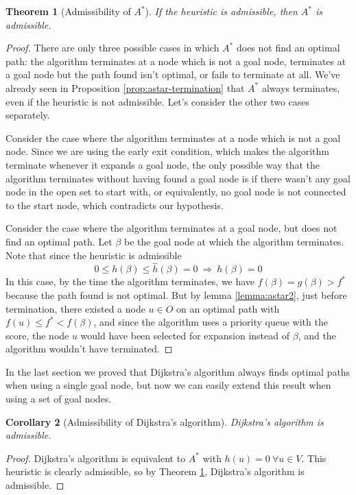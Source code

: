 \documentclass[a4paper,10pt]{report}
\newtheorem{theorem}{Theorem}[chapter]
\newtheorem{corollary}[theorem]{Corollary}
\begin{document}
\begin{theorem}[Admissibility of $A^*$]
\label{thm:astar}
If the heuristic is admissible, then $A^*$ is admissible.
\end{theorem}
\begin{proof}
There are only three possible cases in which $A^*$ does not find an optimal path: the algorithm terminates at a node which is not a goal node, terminates at a goal node but the path found isn't optimal, or fails to terminate at all. We've already seen in Proposition \ref{prop:astar-termination} that $A^*$ always terminates, even if the heuristic is not admissible. Let's consider the other two cases separately.

Consider the case where the algorithm terminates at a node which is not a goal node. Since we are using the early exit condition, which makes the algorithm terminate whenever it expands a goal node, the only possible way that the algorithm terminates without having found a goal node is if there wasn't any goal node in the open set to start with, or equivalently, no goal node is not connected to the start node, which contradicts our hypothesis.

Consider the case where the algorithm terminates at a goal node, but does not find an optimal path. Let $\beta$ be the goal node at which the algorithm terminates. Note that since the heuristic is admissible
\[ 0 \leq h(\beta) \leq \hat{h}(\beta) = 0 \  \Rightarrow \  h(\beta) = 0 \]
In this case, by the time the algorithm terminates, we have $f(\beta) = g(\beta) > f^*$ because the path found is not optimal. But by lemma \ref{lemma:astar2}, just before termination, there existed a node $u \in O$ on an optimal path with $f(u) \leq f^* < f(\beta)$, and since the algorithm uses a priority queue with the score, the node $u$ would have been selected for expansion instead of $\beta$, and the algorithm wouldn't have terminated.
\end{proof}

In the last section we proved that Dijkstra's algorithm always finds optimal paths when using a single goal node, but now we can easily extend this result when using a set of goal nodes.

\begin{corollary}[Admissibility of Dijkstra's algorithm]
Dijkstra's algorithm is admissible.
\end{corollary}
\begin{proof}
Dijkstra's algorithm is equivalent to $A^*$ with $h(u) = 0 \  \forall u \in V$. This heuristic is clearly admissible, so by Theorem \ref{thm:astar}, Dijkstra's algorithm is admissible.
\end{proof}
\end{document}
